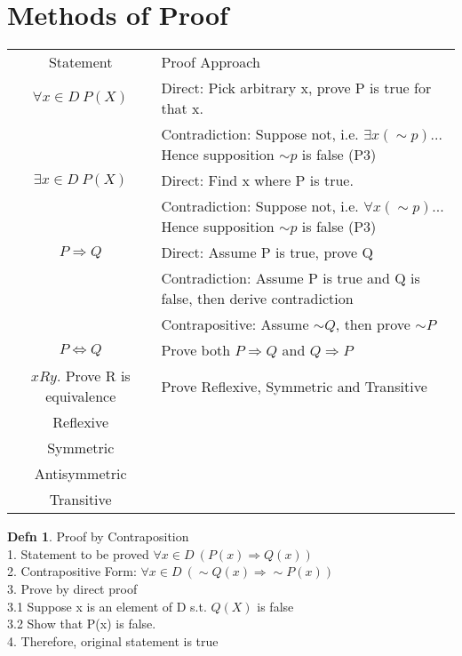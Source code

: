 \documentclass[a4paper]{article}
\theoremstyle{definition}
\newtheorem*{defn}{Defn}
\begin{document}
\section{Methods of Proof}

\begin{tabular} {|c|l|}
  \hline
  Statement & Proof Approach \\
  $\forall x \in D\ P(X)$ & Direct: Pick arbitrary x, prove P is true for that x. \\
                    & Contradiction: Suppose not, i.e. $ \exists x(\sim p)$... Hence supposition $\sim p$ is false (P3) \\
  \hline
  $\exists x \in D\ P(X)$ & Direct: Find x where P is true. \\
                    & Contradiction: Suppose not, i.e. $\forall x (\sim p)$... Hence supposition $\sim p$ is false (P3) \\
  \hline
  $P \Rightarrow Q$ & Direct: Assume P is true, prove Q \\
                    & Contradiction: Assume P is true and Q is false, then derive contradiction \\
                    & Contrapositive: Assume $\sim Q$, then prove $\sim P$ \\
  \hline
  $P \Leftrightarrow Q$ & Prove both $P \Rightarrow Q$ and $Q \Rightarrow P$ \\
  \hline
  $xRy$. Prove R is equivalence  & Prove Reflexive, Symmetric and Transitive \\
  \hline
  Reflexive &  \\
  \hline
  Symmetric &  \\
  \hline
  Antisymmetric &  \\
  \hline
  Transitive &  \\
  \hline


\end{tabular}

\begin{defn}{Proof by Contraposition}\\
  1. Statement to be proved $\forall x \in D\ (P(x) \Rightarrow Q(x))$\\
  2. Contrapositive Form: $\forall x \in D\ (\sim Q(x) \Rightarrow \sim P(x))$\\
  3. Prove by direct proof\\
  3.1 Suppose x is an element of D s.t. $Q(X)$ is false\\
  3.2 Show that P(x) is false.\\
  4. Therefore, original statement is true
\end{defn}
\end{document}
